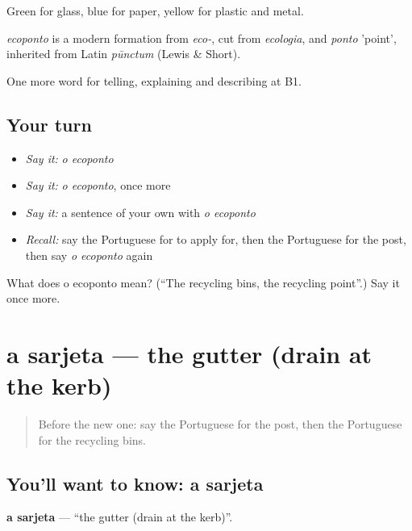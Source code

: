Green for glass, blue for paper, yellow for plastic and metal.

\begin{cousinweb}
\emph{ecoponto} is a modern formation from \emph{eco-}, cut from \emph{ecologia}, and \emph{ponto} 'point', inherited from Latin \emph{pūnctum} (Lewis \& Short).
\end{cousinweb}

\begin{grammarlens}[title={What you've built}]
One more word for telling, explaining and describing at B1.
\end{grammarlens}

\subsection*{Your turn}
\begin{itemize}
\raggedright
  \item \emph{Say it:} \emph{o ecoponto}
  \item \emph{Say it:} \emph{o ecoponto}, once more
  \item \emph{Say it:} a sentence of your own with \emph{o ecoponto}
  \item \emph{Recall:} say the Portuguese for to apply for, then the Portuguese for the post, then say \emph{o ecoponto} again
\end{itemize}

\begin{tcolorbox}[breakable,colback=teal!4,colframe=teal!35!black,title={Before you move on}]
What does o ecoponto mean? (\textquotedblleft{}The recycling bins, the recycling point\textquotedblright{}.) Say it once more.
\end{tcolorbox}
\section[a sarjeta]{a sarjeta — the gutter (drain at the kerb)}

\label{lesson:PT-C444-sarjeta}



\begin{quote}
Before the new one: say the Portuguese for the post, then the Portuguese for the recycling bins.
\end{quote}

\subsection*{You'll want to know: a sarjeta}
\textbf{a sarjeta} — \textquotedblleft{}the gutter (drain at the kerb)\textquotedblright{}.

